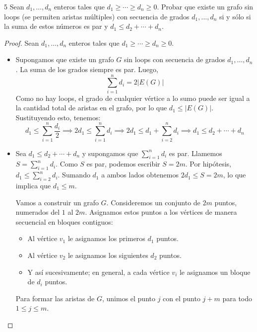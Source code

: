 \begin{ejercicio}{5}
	Sean \( d_1, \ldots, d_n \) enteros tales que \( d_1 \geq \cdots \geq d_n \geq 0 \). Probar que existe un grafo sin loops (se permiten aristas múltiples) con secuencia de grados \( d_1, \ldots, d_n \) si y sólo si la suma de estos números es par y \( d_1 \leq d_2 + \cdots + d_n \).
\end{ejercicio}
\begin{proof}
	Sean \( d_1, \ldots, d_n \) enteros tales que \( d_1 \geq \cdots \geq d_n \geq 0 \).
	\begin{itemize}
		\item[\(\Longrightarrow\))] Supongamos que existe un grafo \( G \) sin loops con secuencia de grados \( d_1, \ldots, d_n \). La suma de los grados siempre es par. Luego,
		      \[
			      \sum_{i=1}^n d_i = 2 |E(G)|
		      \]
		      Como no hay loops, el grado de cualquier vértice a lo sumo puede ser igual a la cantidad total de aristas en el grafo, por lo que \( d_1 \le |E(G)| \). Sustituyendo esto, tenemos:
		      \[
			      d_1 \le \sum_{i=1}^n \frac{d_i}{2} \implies 2d_1 \le \sum_{i=1}^n d_i \implies 2d_1 \le d_1 + \sum_{i=2}^n d_i \implies d_1 \le d_2 + \cdots + d_n
		      \]

		\item[\(\Longleftarrow\))] Sea \( d_1 \le d_2 + \cdots + d_n \) y supongamos que \( \sum_{i=1}^n d_i \) es par.
		      Llamemos \( S = \sum_{i=1}^n d_i \). Como \( S \) es par, podemos escribir \( S = 2m \).
		      Por hipótesis, \( d_1 \le \sum_{i=2}^n d_i \). Sumando \( d_1 \) a ambos lados obtenemos \( 2d_1 \le S = 2m \), lo que implica que \( d_1 \le m \).

		      Vamos a construir un grafo \( G \). Consideremos un conjunto de \( 2m \) puntos, numerados del \( 1 \) al \( 2m \).
		      Asignamos estos puntos a los vértices de manera secuencial en bloques contiguos:
		      \begin{itemize}
			      \item Al vértice \( v_1 \) le asignamos los primeros \( d_1 \) puntos.
			      \item Al vértice \( v_2 \) le asignamos los siguientes \( d_2 \) puntos.
			      \item Y así sucesivamente; en general, a cada vértice \( v_i \) le asignamos un bloque de \( d_i \) puntos.
		      \end{itemize}

		      Para formar las aristas de \( G \), unimos el punto \( j \) con el punto \( j+m \) para todo \( 1 \le j \le m \).


\end{itemize}
\end{proof}
